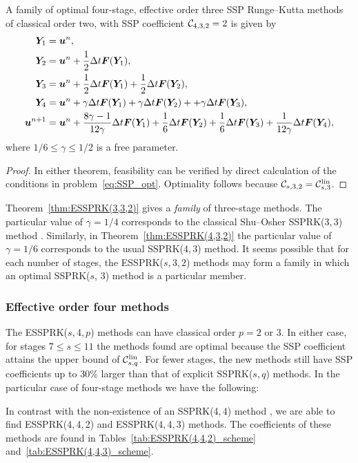 \documentclass[final]{siamltex}  %
\begin{document}
\begin{theorem}\label{thm:ESSPRK(4,3,2)}
	A family of optimal four-stage, effective order three SSP Runge--Kutta 
	methods of classical order two, with SSP coefficient $\mathcal{C}_{4,3,2} = 2$ is given by
    \begin{displaymath}
    		\begin{split}
    			\bm{Y}_1 &= \bm{u}^n, \\
    			\bm{Y}_2 &= \bm{u}^n + \frac{1}{2}\Delta t\bm{F}(\bm{Y}_1), \\
    			\bm{Y}_3 &= \bm{u}^n + \frac{1}{2}\Delta t\bm{F}(\bm{Y}_1) + \frac{1}{2}\Delta t\bm{F}(\bm{Y}_2), \\
    			\bm{Y}_4 &= \bm{u}^n + \gamma\Delta t\bm{F}(\bm{Y}_1) + \gamma\Delta t\bm{F}(\bm{Y}_2) + + \gamma\Delta t\bm{F}(\bm{Y}_3), \\
    			\bm{u}^{n+1} &= \bm{u}^n + \frac{8\gamma-1}{12\gamma}\Delta t\bm{F}(\bm{Y}_1) + \frac{1}{6}\Delta t\bm{F}(\bm{Y}_2) + \frac{1}{6}\Delta t\bm{F}(\bm{Y}_3) + \frac{1}{12\gamma}\Delta t\bm{F}(\bm{Y}_4),
        \end{split}
    \end{displaymath}
    where $ 1/6 \leq \gamma \leq 1/2 $ is a free parameter.
\end{theorem}
\begin{proof}
	In either theorem, feasibility can be verified by direct calculation of the 
	conditions in problem~\eqref{eq:SSP_opt}. Optimality follows because 
	$\mathcal{C}_{s,3,2} = \mathcal{C}^{\textnormal{lin}}_{s,3}$.
\end{proof}

Theorem~\ref{thm:ESSPRK(3,3,2)} gives a \emph{family} of three-stage 
methods. 
The particular value of $\gamma = 1/4$ corresponds to the classical
Shu--Osher SSPRK($3,3$) method \cite{Gottlieb/Shu:1998}.
Similarly, in Theorem~\ref{thm:ESSPRK(4,3,2)} the particular value of 
$\gamma = 1/6$ corresponds to the usual SSPRK($4,3$) method.
It seems possible that for each number of stages, the 
ESSPRK($s, 3, 2$) methods may form a family in which an optimal 
SSPRK($s$, $3$) method is a particular member. 

\subsubsection{Effective order four methods}\label{subsubsec:4th_ESSPRK}
The ESSPRK($s,4,p$) methods can have classical order $p=2$ or $3$.
In either case, for stages $7 \le s \le 11$ the methods found are
optimal because the SSP coefficient attains the upper bound of
$\mathcal{C}^{\textnormal{lin}}_{s,q}$.
For fewer stages, the new methods still have SSP coefficients up to
30\% larger than that of explicit SSPRK($s,q$) methods.
In the particular case of four-stage methods we have the following:
\begin{remark}
	In contrast with the non-existence of an SSPRK(4,\,4) method 
	\cite{Gottlieb/Shu:1998,Ruuth2002}, 
	we are able to find ESSPRK(4,\,4,\,2) and ESSPRK(4,\,4,\,3) methods.
	The coefficients of these methods are found in
	Tables~\ref{tab:ESSPRK(4,4,2)_scheme}
	and~\ref{tab:ESSPRK(4,4,3)_scheme}.
\end{remark}
\end{document}
